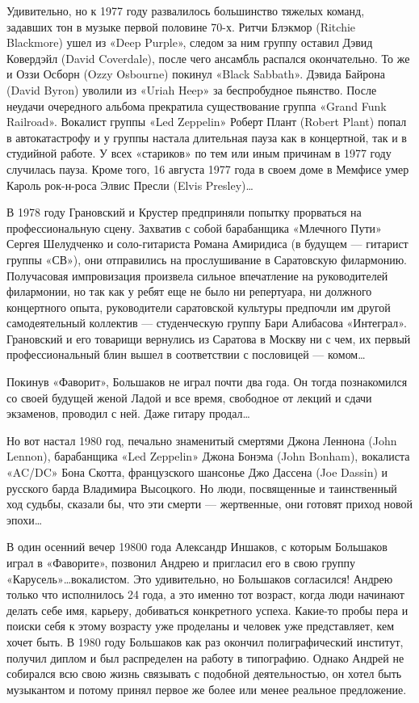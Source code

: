 \documentclass[10pt, twoside]{book}
\begin{document}
Удивительно, но к 1977 году развалилось большинство тяжелых команд, задавших тон в музыке первой половине 70-х.
Ритчи Блэкмор (Ritchie Blackmore) ушел из «Deep Purple», следом за ним группу оставил Дэвид Ковердэйл (David Coverdale),
после чего ансамбль распался окончательно. То же и Оззи Осборн (Ozzy Osbourne) покинул «Black Sabbath». Дэвида Байрона
(David Byron) уволили из «Uriah Heep» за беспробудное пьянство. После неудачи очередного альбома прекратила
существование группа «Grand Funk Railroad». Вокалист группы «Led Zeppelin» Роберт Плант (Robert Plant) попал в
автокатастрофу и у группы настала длительная пауза как в концертной, так и в студийной работе. У всех «стариков» по тем
или иным причинам в 1977 году случилась пауза. Кроме того, 16 августа 1977 года в своем доме в Мемфисе умер Кароль
рок-н-роса Элвис Пресли (Elvis Presley)\ldots

В 1978 году Грановский и Крустер предприняли попытку прорваться на профессиональную сцену. Захватив с собой барабанщика
«Млечного Пути» Сергея Шелудченко и соло-гитариста Романа Амиридиса (в будущем — гитарист группы «СВ»), они отправились
на прослушивание в Саратовскую филармонию. Получасовая импровизация произвела сильное впечатление на руководителей
филармонии, но так как у ребят еще не было ни репертуара, ни должного концертного опыта, руководители саратовской
культуры предпочли им другой самодеятельный коллектив — студенческую группу Бари Алибасова «Интеграл». Грановский и его
товарищи вернулись из Саратова в Москву ни с чем, их первый профессиональный блин вышел в соответствии с пословицей —
комом\ldots

Покинув «Фаворит», Большаков не играл почти два года. Он тогда познакомился со своей будущей женой Ладой и все время,
свободное от лекций и сдачи экзаменов, проводил с ней. Даже гитару продал\ldots

Но вот настал 1980 год, печально знаменитый смертями Джона Леннона (John Lennon), барабанщика «Led Zeppelin» Джона
Бонэма (John Bonham), вокалиста «AC/DC» Бона Скотта, французского шансонье Джо Дассена (Joe Dassin) и русского барда
Владимира Высоцкого. Но люди, посвященные и таинственный ход судьбы, сказали бы, что эти смерти — жертвенные, они
готовят приход новой эпохи\ldots

В один осенний вечер 19800 года Александр Иншаков, с которым Большаков играл в «Фаворите», позвонил Андрею и пригласил
его в свою группу «Карусель»\ldots вокалистом. Это удивительно, но Большаков согласился! Андрею только что исполнилось
24 года, а это именно тот возраст, когда люди начинают делать себе имя, карьеру, добиваться конкретного успеха. Какие-то
пробы пера и поиски себя к этому возрасту уже проделаны и человек уже представляет, кем хочет быть. В 1980 году
Большаков как раз окончил полиграфический институт, получил диплом и был распределен на работу в типографию. Однако
Андрей не собирался всю свою жизнь связывать с подобной деятельностью, он хотел быть музыкантом и потому принял первое
же более или менее реальное предложение.
\end{document}
